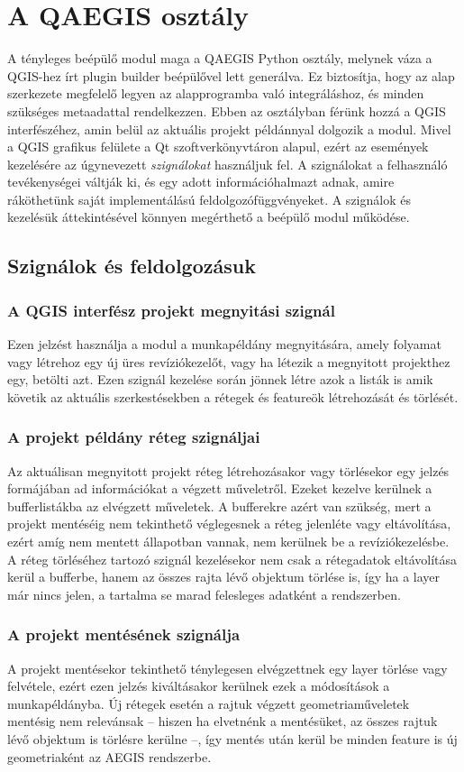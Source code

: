 \section{A QAEGIS osztály}
A tényleges beépülő modul maga a QAEGIS Python osztály, melynek váza a QGIS-hez írt plugin builder beépülővel lett generálva. Ez biztosítja, hogy az alap szerkezete megfelelő legyen az alapprogramba való integráláshoz, és minden szükséges metaadattal rendelkezzen. Ebben az osztályban férünk hozzá a QGIS interfészéhez, amin belül az aktuális projekt példánnyal dolgozik a modul. Mivel a QGIS grafikus felülete a Qt szoftverkönyvtáron alapul, ezért az események kezelésére az úgynevezett \emph{szignálokat} használjuk fel. A szignálokat a felhasználó tevékenységei váltják ki, és egy adott információhalmazt adnak, amire ráköthetünk saját implementálású feldolgozófüggvényeket. A szignálok és kezelésük áttekintésével könnyen megérthető a beépülő modul működése.
\subsection{Szignálok és feldolgozásuk}
\subsubsection{A QGIS interfész projekt megnyitási szignál}
Ezen jelzést használja a modul a munkapéldány megnyitására, amely folyamat vagy létrehoz egy új üres revíziókezelőt, vagy ha létezik a megnyitott projekthez egy, betölti azt. Ezen szignál kezelése során jönnek létre azok a listák is amik követik az aktuális szerkestésekben a rétegek és featureök létrehozását és törlését.
\subsubsection{A projekt példány réteg szignáljai}
Az aktuálisan megnyitott projekt réteg létrehozásakor vagy törlésekor egy jelzés formájában ad információkat a végzett műveletről. Ezeket kezelve kerülnek a bufferlistákba az elvégzett műveletek. A bufferekre azért van szükség, mert a projekt mentéséig nem tekinthető véglegesnek a réteg jelenléte vagy eltávolítása, ezért amíg nem mentett állapotban vannak, nem kerülnek be a revíziókezelésbe. A réteg törléséhez tartozó szignál kezelésekor nem csak a rétegadatok eltávolítása kerül a bufferbe, hanem az összes rajta lévő objektum törlése is, így ha a layer már nincs jelen, a tartalma se marad felesleges adatként a rendszerben.
\subsubsection{A projekt mentésének szignálja}
A projekt mentésekor tekinthető ténylegesen elvégzettnek egy layer törlése vagy felvétele, ezért ezen jelzés kiváltásakor kerülnek ezek a módosítások a munkapéldányba. Új rétegek esetén a rajtuk végzett geometriaműveletek mentésig nem relevánsak -- hiszen ha elvetnénk a mentésüket, az összes rajtuk lévő objektum is törlésre kerülne --, így mentés után kerül be minden feature is új geometriaként az AEGIS rendszerbe.
